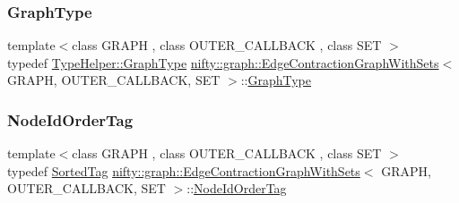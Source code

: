 \subsubsection{\texorpdfstring{Graph\+Type}{GraphType}}
{\footnotesize\ttfamily template$<$class G\+R\+A\+PH , class O\+U\+T\+E\+R\+\_\+\+C\+A\+L\+L\+B\+A\+CK , class S\+ET $>$ \\
typedef \hyperlink{structnifty_1_1graph_1_1EdgeContractionGraphWithSetsHelper_a7f5226bf25f277d906a526db55556cdf}{Type\+Helper\+::\+Graph\+Type} \hyperlink{classnifty_1_1graph_1_1EdgeContractionGraphWithSets}{nifty\+::graph\+::\+Edge\+Contraction\+Graph\+With\+Sets}$<$ G\+R\+A\+PH, O\+U\+T\+E\+R\+\_\+\+C\+A\+L\+L\+B\+A\+CK, S\+ET $>$\+::\hyperlink{classnifty_1_1graph_1_1EdgeContractionGraphWithSets_abadbbebcd10e37a1a3f59bb967accdf0}{Graph\+Type}}

\mbox{\label{classnifty_1_1graph_1_1EdgeContractionGraphWithSets_aacddf197fc8a2d4268d971bf026323f4}} 
\subsubsection{\texorpdfstring{Node\+Id\+Order\+Tag}{NodeIdOrderTag}}
{\footnotesize\ttfamily template$<$class G\+R\+A\+PH , class O\+U\+T\+E\+R\+\_\+\+C\+A\+L\+L\+B\+A\+CK , class S\+ET $>$ \\
typedef \hyperlink{structnifty_1_1graph_1_1SortedTag}{Sorted\+Tag} \hyperlink{classnifty_1_1graph_1_1EdgeContractionGraphWithSets}{nifty\+::graph\+::\+Edge\+Contraction\+Graph\+With\+Sets}$<$ G\+R\+A\+PH, O\+U\+T\+E\+R\+\_\+\+C\+A\+L\+L\+B\+A\+CK, S\+ET $>$\+::\hyperlink{classnifty_1_1graph_1_1EdgeContractionGraphWithSets_aacddf197fc8a2d4268d971bf026323f4}{Node\+Id\+Order\+Tag}}

\mbox{\label{classnifty_1_1graph_1_1EdgeContractionGraphWithSets_a6dbcfb7d4bf82719837d809465f0ac06}} 
